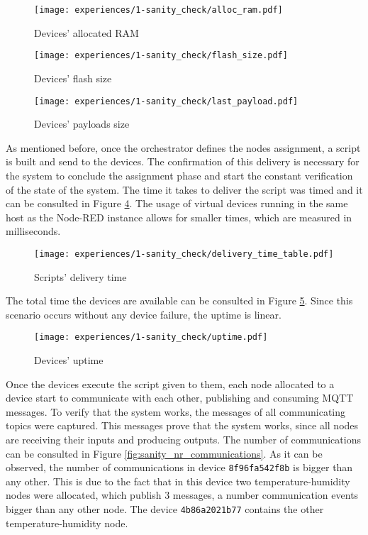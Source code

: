 \begin{figure}[h]
\centering
\texttt{[image: experiences/1-sanity\_check/alloc\_ram.pdf]}
\caption[Devices' allocated RAM]{Devices' allocated RAM}\label{fig:sanity_check_alloc_ram}
\end{figure}

\begin{figure}[H]
\centering
\texttt{[image: experiences/1-sanity\_check/flash\_size.pdf]}
\caption[Devices' flash size]{Devices' flash size}\label{fig:sanity_check_flash_size}
\end{figure}

\begin{figure}[h]
\centering
\texttt{[image: experiences/1-sanity\_check/last\_payload.pdf]}
\caption[Devices' payloads size]{Devices' payloads size}\label{fig:sanity_check_last_payload}
\end{figure}

As mentioned before, once the orchestrator defines the nodes assignment, a script is built and send to the devices. The confirmation of this delivery is necessary for the system to conclude the assignment phase and start the constant verification of the state of the system. The time it takes to deliver the script was timed and it can be consulted in Figure \ref{fig:sanity_check_script_delivery_time}. The usage of virtual devices running in the same host as the Node-RED instance allows for smaller times, which are measured in milliseconds.

\begin{figure}[h]
\centering
\texttt{[image: experiences/1-sanity\_check/delivery\_time\_table.pdf]}
\caption[Scripts' delivery time]{Scripts' delivery time}\label{fig:sanity_check_script_delivery_time}
\end{figure}

The total time the devices are available can be consulted in Figure \ref{fig:sanity_check_uptime}. Since this scenario occurs without any device failure, the uptime is linear.

\begin{figure}[h]
\centering
\texttt{[image: experiences/1-sanity\_check/uptime.pdf]}
\caption[Devices' uptime]{Devices' uptime}\label{fig:sanity_check_uptime}
\end{figure}

Once the devices execute the script given to them, each node allocated to a device start to communicate with each other, publishing and consuming MQTT messages. To verify that the system works, the messages of all communicating topics were captured. This messages prove that the system works, since all nodes are receiving their inputs and producing outputs. The number of communications can be consulted in Figure \ref{fig:sanity_nr_communications}. As it can be observed, the number of communications in device \texttt{8f96fa542f8b} is bigger than any other. This is due to the fact that in this device two temperature-humidity nodes were allocated, which publish 3 messages, a number communication events bigger than any other node. The device \texttt{4b86a2021b77} contains the other temperature-humidity node.

